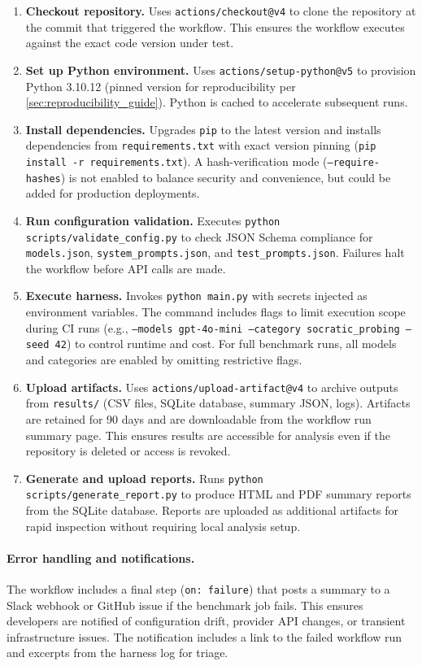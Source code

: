 \begin{enumerate}
\item \textbf{Checkout repository.} Uses \texttt{actions/checkout@v4} to clone the repository at the commit that triggered the workflow. This ensures the workflow executes against the exact code version under test.
\item \textbf{Set up Python environment.} Uses \texttt{actions/setup-python@v5} to provision Python 3.10.12 (pinned version for reproducibility per \cref{sec:reproducibility_guide}). Python is cached to accelerate subsequent runs.
\item \textbf{Install dependencies.} Upgrades \texttt{pip} to the latest version and installs dependencies from \texttt{requirements.txt} with exact version pinning (\texttt{pip install -r requirements.txt}). A hash-verification mode (\texttt{--require-hashes}) is not enabled to balance security and convenience, but could be added for production deployments.
\item \textbf{Run configuration validation.} Executes \texttt{python scripts/validate\_config.py} to check JSON Schema compliance for \texttt{models.json}, \texttt{system\_prompts.json}, and \texttt{test\_prompts.json}. Failures halt the workflow before API calls are made.
\item \textbf{Execute harness.} Invokes \texttt{python main.py} with secrets injected as environment variables. The command includes flags to limit execution scope during CI runs (e.g., \texttt{--models gpt-4o-mini --category socratic\_probing --seed 42}) to control runtime and cost. For full benchmark runs, all models and categories are enabled by omitting restrictive flags.
\item \textbf{Upload artifacts.} Uses \texttt{actions/upload-artifact@v4} to archive outputs from \texttt{results/} (CSV files, SQLite database, summary JSON, logs). Artifacts are retained for 90 days and are downloadable from the workflow run summary page. This ensures results are accessible for analysis even if the repository is deleted or access is revoked.
\item \textbf{Generate and upload reports.} Runs \texttt{python scripts/generate\_report.py} to produce HTML and PDF summary reports from the SQLite database. Reports are uploaded as additional artifacts for rapid inspection without requiring local analysis setup.
\end{enumerate}

\paragraph{Error handling and notifications.} The workflow includes a final step (\texttt{on: failure}) that posts a summary to a Slack webhook or GitHub issue if the benchmark job fails. This ensures developers are notified of configuration drift, provider API changes, or transient infrastructure issues. The notification includes a link to the failed workflow run and excerpts from the harness log for triage.

